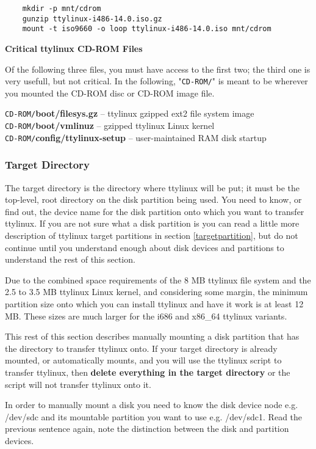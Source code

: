 \documentclass[10pt]{article}
\begin{document}
\begin{lstlisting}
	mkdir -p mnt/cdrom
	gunzip ttylinux-i486-14.0.iso.gz
	mount -t iso9660 -o loop ttylinux-i486-14.0.iso mnt/cdrom
\end{lstlisting}

{\bf Critical ttylinux CD-ROM Files}

Of the following three files, you must have access to the first two; the third
one is very usefull, but not critical. In the following, "{\tt CD-ROM/}" is
meant to be wherever you mounted the CD-ROM disc or CD-ROM image file.

{\tt CD-ROM/}{\bf boot/filesys.gz} -- ttylinux gzipped ext2 file system image\\
{\tt CD-ROM/}{\bf boot/vmlinuz} -- gzipped ttylinux Linux kernel\\
{\tt CD-ROM/}{\bf config/ttylinux-setup} -- user-maintained RAM disk startup

\subsubsection{Target Directory}

The target directory is the directory where ttylinux will be put; it must be
the top-level, root directory on the disk partition being used. You need to
know, or find out, the device name for the disk partition onto which you want
to transfer ttylinux. If you are not sure what a disk partition is you can read
a little more description of ttylinux target partitions in section
\ref{targetpartition}, but do not continue until you understand enough about
disk devices and partitions to understand the rest of this section.

Due to the combined space requirements of the 8 MB ttylinux file system and the
2.5 to 3.5 MB ttylinux Linux kernel, and considering some margin, the minimum
partition size onto which you can install ttylinux and have it work is at least
12 MB. These sizes are much larger for the i686 and x86\_64 ttylinux variants.

This rest of this section describes manually mounting a disk partition that has
the directory to transfer ttylinux onto. If your target directory is already
mounted, or automatically mounts, and you will use the ttylinux script to
transfer ttylinux, then {\bf delete everything in the target directory} or the
script will not transfer ttylinux onto it.

In order to manually mount a disk you need to know the disk device node e.g.
/dev/sdc and its mountable partition you want to use e.g. /dev/sdc1. Read the
previous sentence again, note the distinction between the disk and partition
devices.
\end{document}
